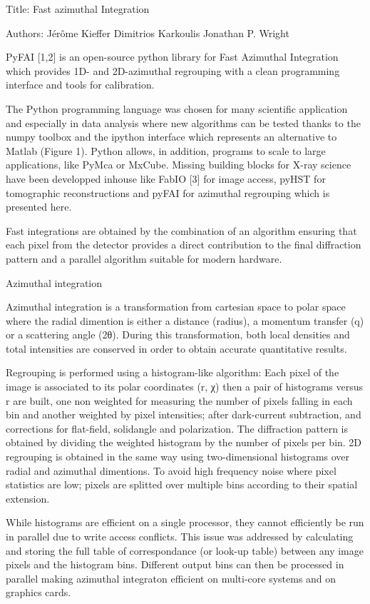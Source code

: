 Title: Fast azimuthal Integration

Authors: 	Jérôme Kieffer
			Dimitrios Karkoulis
			Jonathan P. Wright

PyFAI [1,2] is an open-source python library for Fast Azimuthal Integration
which provides 1D- and 2D-azimuthal regrouping with a clean programming interface and
tools for calibration.

The Python programming language was chosen for many  scientific application and
especially in data analysis where new algorithms can be tested thanks to the
numpy toolbox and the ipython interface  which represents an
alternative to Matlab (Figure 1). 
Python allows, in addition, programs to scale to large applications,
like PyMca or MxCube.
Missing building blocks for X-ray science have been developped inhouse like
FabIO [3] for image access, pyHST for tomographic reconstructions and
pyFAI for azimuthal regrouping which is presented here.

Fast integrations are obtained by the combination of an algorithm ensuring that
each pixel from the detector provides a direct contribution to the final
diffraction pattern and a parallel algorithm suitable for modern hardware.

Azimuthal integration

Azimuthal integration is a transformation from cartesian space to polar space
where the radial dimention is either a distance (radius), a momentum transfer
(q) or a scattering angle (2θ).
During this transformation, both local densities and total intensities are
conserved in order to obtain accurate quantitative results. 

Regrouping is performed using a histogram-like algorithm: 
Each pixel of the image is associated to its polar coordinates (r, χ) then a
pair of histograms versus r are built, one non weighted for measuring the
number of pixels falling in each bin and another weighted by pixel intensities;
after dark-current subtraction, and corrections for flat-field, solidangle and polarization.
The diffraction pattern is obtained by dividing the weighted histogram
by the number of pixels per bin. 
2D regrouping is obtained in the same way using two-dimensional histograms over
radial and azimuthal dimentions.
To avoid high frequency noise where pixel statistics are low; pixels are
splitted over multiple bins according to their spatial extension. 

While histograms are efficient on a single processor, they cannot efficiently be
run in parallel due to write access conflicts. This issue was addressed by
calculating and storing the full table of correspondance (or look-up
table) between any image pixels and the histogram bins. Different output bins
can then be processed in parallel making azimuthal integraton efficient on
multi-core systems and on graphics cards.

